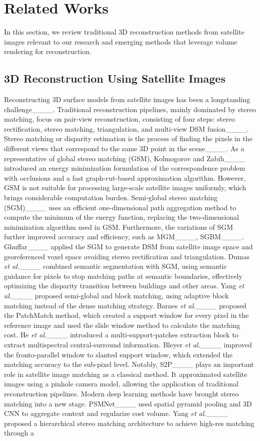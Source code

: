\section{Related Works}
\label{related_works}
In this section, we review traditional 3D reconstruction methods from satellite images relevant to our research and emerging methods that leverage volume rendering for reconstruction.

\subsection{3D Reconstruction Using Satellite Images}
Reconstructing 3D surface models from satellite images has been a longstanding challenge____. Traditional reconstruction pipelines, mainly dominated by stereo matching, focus on pair-view reconstruction, consisting of four steps: stereo rectification, stereo matching, triangulation, and multi-view DSM fusion____. Stereo matching or disparity estimation is the process of finding the pixels in the different views that correspond to the same 3D point in the scene____. As a representative of global stereo matching (GSM), Kolmogorov and Zabih____ introduced an energy minimization formulation of the correspondence problem with occlusions and a fast graph-cut-based approximation algorithm. However, GSM is not suitable for processing large-scale satellite images uniformly, which brings considerable computation burden. Semi-global stereo matching (SGM)____ uses an efficient one-dimensional path aggregation method to compute the minimum of the energy function, replacing the two-dimensional minimization algorithm used in GSM. Furthermore, the variations of SGM further improved accuracy and efficiency, such as MGM____, SGBM____. Ghuffar____ applied the SGM to generate DSM from satellite image space and georeferenced voxel space avoiding stereo rectification and triangulation. Dumas \textit{et al.}____ combined semantic segmentation with SGM, using semantic guidance for pixels to stop matching paths at semantic boundaries, effectively optimizing the disparity transition between buildings and other areas. Yang \textit{et al.}____ proposed semi-global and block matching, using adaptive block matching instead of the dense matching strategy. Barnes \textit{et al.}____ proposed the PatchMatch method, which created a support window for every pixel in the reference image and used the slide window method to calculate the matching cost. He \textit{et al.}____ introduced a multi-support-patches extraction block to extract multispectral central-surround information. Bleyer \textit{et al.}____ improved the fronto-parallel window to slanted support window, which extended the matching accuracy to the sub-pixel level. Notably, S2P____ plays an important role in satellite image matching as a classical method. It approximated satellite images using a pinhole camera model, allowing the application of traditional reconstruction pipelines. Modern deep learning methods have brought stereo matching into a new stage. PSMNet____ used spatial pyramid pooling and 3D CNN to aggregate context and regularize cost volume. Yang \textit{et al.}____ proposed a hierarchical stereo matching architecture to achieve high-res matching through a 
